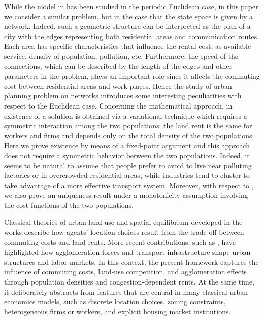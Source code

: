 \documentclass[smallextended,referee,envcountsect,]{svjour3}
\begin{document}
While the model in \cite{barilla} has been studied in the periodic Euclidean case, in this paper we consider a similar problem, but in the case that the state space is given by a network. Indeed, such a geometric structure can be interpreted as the plan of a city with the edges representing both residential areas and communication routes. Each area has specific characteristics that influence the rental cost, as available service, density of population, pollution, etc. Furthermore, the speed of the connections, which can be described by the length of the edges and other parameters in the problem, plays an important role since it affects the commuting cost between residential areas and work places. Hence the study of urban planning problem on networks introduces some interesting peculiarities with respect to the Euclidean case. Concerning the mathematical approach, in \cite{barilla} existence of a solution is obtained via a variational technique which requires a symmetric interaction among the two populations: the land rent is the same for workers and firms and depends only on the total density of the two populations. Here we prove existence by means of a  fixed-point argument and this approach does not require a symmetric behavior between the two populations. Indeed, it seems to be natural to assume that people prefer to avoid to live near polluting factories or in overcrowded residential areas, while industries tend to cluster to take advantage of a more effective transport system. Moreover, with respect to \cite{barilla}, we also prove an uniqueness result under a monotonicity assumption involving the cost functions of the two populations.\par
 Classical theories of urban land use and spatial equilibrium developed in the works \cite{Alonso1964,Mills1967,Muth1969}  describe how agents' location choices result from the trade-off between commuting costs and land rents. More recent contributions, such as \cite{Fujita1999,Duranton2004}, have highlighted how agglomeration forces and transport infrastructure shape urban structures and labor markets. In this context, the present framework captures the influence of commuting costs, land-use competition, and agglomeration effects through population densities and congestion-dependent rents. At the same time, it deliberately abstracts from features that are central in many classical urban economics models, such as discrete location choices, zoning constraints, heterogeneous firms or workers, and explicit housing market institutions.
\par
\end{document}
